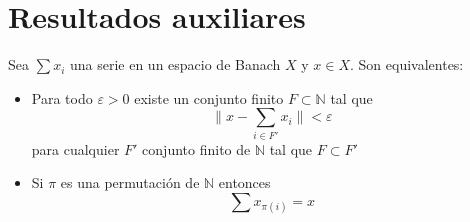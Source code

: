 	\chapter{Resultados auxiliares}
	
	\begin{lemma} \label{lm:incondicionalidad-reordenacion}
		Sea $\sum{x_i}$ una serie en un espacio de Banach $X$ y $x \in X$. Son equivalentes:
		\begin{itemize}
			\item[$(i)$] Para todo $\varepsilon > 0$ existe un conjunto finito $F \subset \mathbb{N}$ tal que 
			$$\big\| x - \displaystyle \sum_{i \in F'}{x_i} \big\| < \varepsilon$$
			para cualquier $F'$ conjunto finito de $\mathbb{N}$ tal que $F \subset F'$
			\item[$(ii)$] Si $\pi$ es una permutación de $\mathbb{N}$ entonces 
			$$\sum{x_{\pi(i)}}=x$$
		\end{itemize}
	\end{lemma}
	

